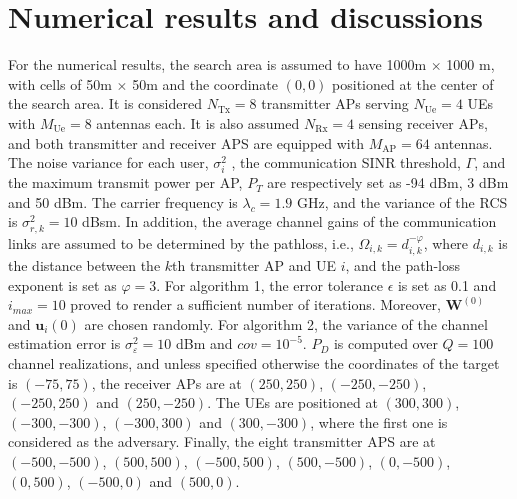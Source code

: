 \documentclass[conference,twocolumn,a4paper]{IEEEtran}
\theoremstyle{remark} \newtheorem{remark}{Remark}
\begin{document}
\section{Numerical results and discussions}
For the numerical results, the search area is assumed to have 1000m $\times$ 1000 m, with cells of 50m $\times$ 50m and the coordinate $(0,0)$ positioned at the center of the search area. It is considered $N_{\mathrm{Tx}}$$=$$8$ transmitter APs serving $N_{\mathrm{Ue}}$$=$$4$ UEs with $M_{\mathrm{Ue}}$$=$$8$ antennas each. It is also assumed $N_{\mathrm{Rx}}$$=$$4$ sensing receiver APs, and both transmitter and receiver APS are equipped with $M_{\mathrm{AP}}$$=$$64$ antennas. The noise variance for each user, $\sigma_i^2$ , the communication SINR threshold, $\Gamma$, and the maximum transmit power per AP, $P_T$ are respectively set as -94 dBm, 3 dBm and 50 dBm. The carrier frequency is $\lambda_c$$=$$1.9$ GHz, and the variance of the RCS is $\sigma_{r,k}^2$$=$$10$ dBsm. In addition,  the average channel gains of the communication links are assumed to be determined by the pathloss, i.e., $\Omega_{i,k}$$=$$d_{i,k}^{-\varphi}$, where $d_{i,k}$ is the distance between the $k$th transmitter AP and UE $i$, and the path-loss exponent is set as $\varphi$$=$$3$. For algorithm 1,  the error tolerance $\epsilon$ is set as 0.1 and $i_{max}$$=$$10$ proved to render a sufficient number of iterations. Moreover, $\mathbf{W}^{(0)}$ and $\mathbf{u}_i(0)$ are chosen randomly. For algorithm 2, the variance of the channel estimation error is $\sigma_{\varepsilon}^2$$=$$10$ dBm and $cov$$=$$10^{-5}$. $P_D$ is computed over $Q$$=$$100$ channel realizations, and unless specified otherwise the coordinates of the target is $(-75,75)$, the receiver APs are at $(250, 250)$, $(-250,-250)$, $(-250,250)$ and $(250,-250)$. The UEs are positioned at $(300, 300)$, $(-300,-300)$, $(-300,300)$ and $(300,-300)$, where the first one is considered as the adversary. Finally, the eight transmitter APS are at $(-500, -500)$, $(500,500)$, $(-500,500)$, $(500,-500)$, $(0,-500)$, $(0,500)$, $(-500,0)$ and $(500,0)$. 

\end{document}
